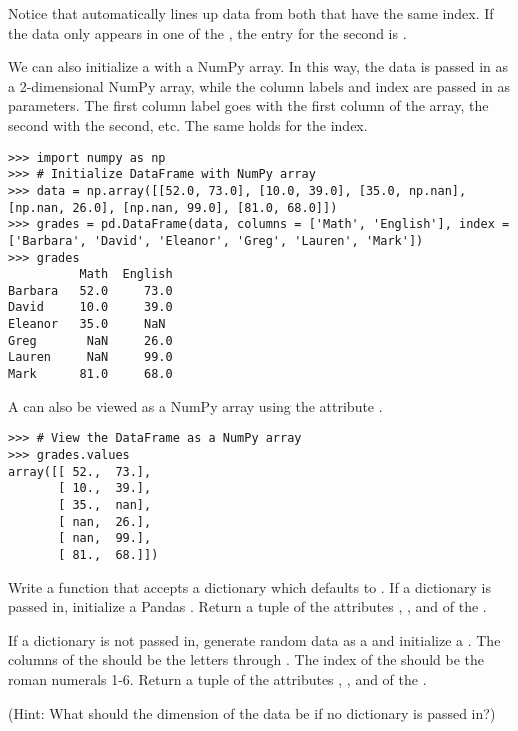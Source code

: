 Notice that  automatically lines up data from both  that have the same index.
If the data only appears in one of the , the entry for the second  is .

We can also initialize a  with a NumPy array.
In this way, the data is passed in as a 2-dimensional NumPy array, while the column labels and index are passed in as parameters.
The first column label goes with the first column of the array, the second with the second, etc.
The same holds for the index.

\begin{lstlisting}
>>> import numpy as np
>>> # Initialize DataFrame with NumPy array
>>> data = np.array([[52.0, 73.0], [10.0, 39.0], [35.0, np.nan], [np.nan, 26.0], [np.nan, 99.0], [81.0, 68.0]])
>>> grades = pd.DataFrame(data, columns = ['Math', 'English'], index = ['Barbara', 'David', 'Eleanor', 'Greg', 'Lauren', 'Mark'])
>>> grades
	      Math  English
Barbara   52.0     73.0
David     10.0     39.0
Eleanor   35.0     NaN
Greg       NaN     26.0
Lauren     NaN     99.0
Mark      81.0     68.0
\end{lstlisting}

A  can also be viewed as a NumPy array using the attribute .

\begin{lstlisting}
>>> # View the DataFrame as a NumPy array
>>> grades.values
array([[ 52.,  73.],
       [ 10.,  39.],
       [ 35.,  nan],
       [ nan,  26.],
       [ nan,  99.],
       [ 81.,  68.]])
\end{lstlisting}

\begin{problem}
Write a function  that accepts a dictionary  which defaults to .
If a dictionary is passed in, initialize a Pandas .
Return a tuple of the attributes , , and  of the .

If a dictionary is not passed in, generate random data as a  and initialize a .
The columns of the  should be the letters  through .
The index of the  should be the roman numerals 1-6.
Return a tuple of the attributes , , and  of the .

(Hint: What should the dimension of the data be if no dictionary is passed in?)
\end{problem}

